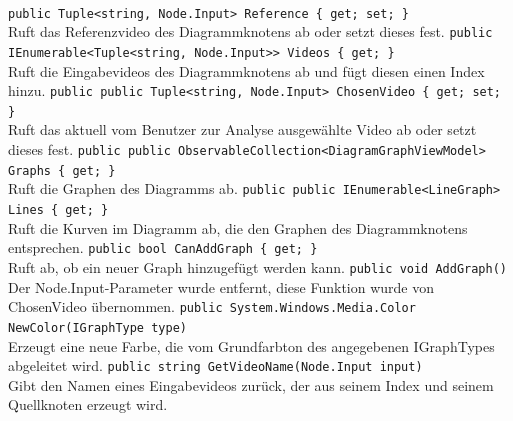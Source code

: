 \paragraph{}
\begin{itemize}
	\add \verb!public Tuple<string, Node.Input> Reference { get; set; }! \\
	Ruft das Referenzvideo des Diagrammknotens ab oder setzt dieses fest.
	\add \verb!public IEnumerable<Tuple<string, Node.Input>> Videos { get; }! \\
	Ruft die Eingabevideos des Diagrammknotens ab und fügt diesen einen Index hinzu.
	\add \verb!public public Tuple<string, Node.Input> ChosenVideo { get; set; }! \\
	Ruft das aktuell vom Benutzer zur Analyse ausgewählte Video ab oder setzt dieses fest.
	\add \verb!public public ObservableCollection<DiagramGraphViewModel> Graphs { get; }! \\
	Ruft die Graphen des Diagramms ab.
		\add \verb!public public IEnumerable<LineGraph> Lines { get; }! \\
	Ruft die Kurven im Diagramm ab, die den Graphen des Diagrammknotens entsprechen. 
	\add \verb!public bool CanAddGraph { get; }! \\
	Ruft ab, ob ein neuer Graph hinzugefügt werden kann.
	\change \verb!public void AddGraph()! \\
	Der Node.Input-Parameter wurde entfernt, diese Funktion wurde von ChosenVideo übernommen.
	\add \verb!public System.Windows.Media.Color NewColor(IGraphType type)! \\
	Erzeugt eine neue Farbe, die vom Grundfarbton des angegebenen IGraphTypes abgeleitet wird.
	\add \verb!public string GetVideoName(Node.Input input)! \\
	Gibt den Namen eines Eingabevideos zurück, der aus seinem Index und seinem Quellknoten erzeugt wird.
\end{itemize}

